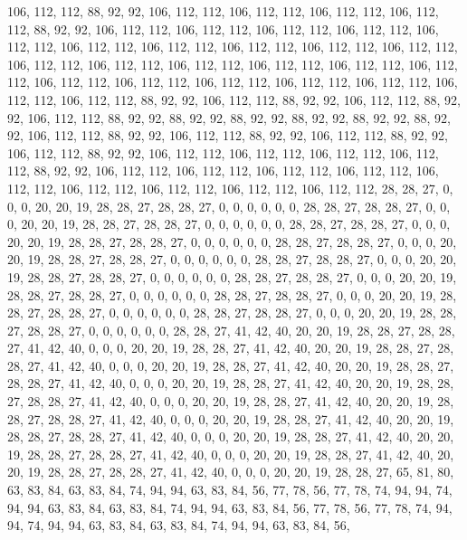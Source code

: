 106, 112, 112, 88, 92, 92, 106, 112, 112, 106, 112, 112, 106, 112, 112, 106, 112, 112, 88, 92, 92, 106, 112, 112, 106, 112, 112, 106, 112, 112, 106, 112, 112, 106, 112, 112, 106, 112, 112, 106, 112, 112, 106, 112, 112, 106, 112, 112, 106, 112, 112, 106, 112, 112, 106, 112, 112, 106, 112, 112, 106, 112, 112, 106,
112, 112, 106, 112, 112, 106, 112, 112, 106, 112, 112, 106, 112, 112, 106, 112, 112, 106, 112, 112, 106, 112, 112, 106, 112, 112, 88, 92, 92, 106, 112, 112, 88, 92, 92, 106, 112, 112, 88, 92, 92, 106, 112, 112, 88, 92, 92, 88, 92, 92, 88, 92, 92, 88, 92, 92, 88, 92, 92, 88, 92, 92, 106, 112,
112, 88, 92, 92, 106, 112, 112, 88, 92, 92, 106, 112, 112, 88, 92, 92, 106, 112, 112, 88, 92, 92, 106, 112, 112, 106, 112, 112, 106, 112, 112, 106, 112, 112, 88, 92, 92, 106, 112, 112, 106, 112, 112, 106, 112, 112, 106, 112, 112, 106, 112, 112, 106, 112, 112, 106, 112, 112, 106, 112, 112, 106, 112, 112,
28, 28, 27, 0, 0, 0, 20, 20, 19, 28, 28, 27, 28, 28, 27, 0, 0, 0, 0, 0, 0, 28, 28, 27, 28, 28, 27, 0, 0, 0, 20, 20, 19, 28, 28, 27, 28, 28, 27, 0, 0, 0, 0, 0, 0, 28, 28, 27, 28, 28, 27, 0, 0, 0, 20, 20, 19, 28, 28, 27, 28, 28, 27, 0,
0, 0, 0, 0, 0, 28, 28, 27, 28, 28, 27, 0, 0, 0, 20, 20, 19, 28, 28, 27, 28, 28, 27, 0, 0, 0, 0, 0, 0, 28, 28, 27, 28, 28, 27, 0, 0, 0, 20, 20, 19, 28, 28, 27, 28, 28, 27, 0, 0, 0, 0, 0, 0, 28, 28, 27, 28, 28, 27, 0, 0, 0, 20, 20,
19, 28, 28, 27, 28, 28, 27, 0, 0, 0, 0, 0, 0, 28, 28, 27, 28, 28, 27, 0, 0, 0, 20, 20, 19, 28, 28, 27, 28, 28, 27, 0, 0, 0, 0, 0, 0, 28, 28, 27, 28, 28, 27, 0, 0, 0, 20, 20, 19, 28, 28, 27, 28, 28, 27, 0, 0, 0, 0, 0, 0, 28, 28, 27,
41, 42, 40, 20, 20, 19, 28, 28, 27, 28, 28, 27, 41, 42, 40, 0, 0, 0, 20, 20, 19, 28, 28, 27, 41, 42, 40, 20, 20, 19, 28, 28, 27, 28, 28, 27, 41, 42, 40, 0, 0, 0, 20, 20, 19, 28, 28, 27, 41, 42, 40, 20, 20, 19, 28, 28, 27, 28, 28, 27, 41, 42, 40, 0,
0, 0, 20, 20, 19, 28, 28, 27, 41, 42, 40, 20, 20, 19, 28, 28, 27, 28, 28, 27, 41, 42, 40, 0, 0, 0, 20, 20, 19, 28, 28, 27, 41, 42, 40, 20, 20, 19, 28, 28, 27, 28, 28, 27, 41, 42, 40, 0, 0, 0, 20, 20, 19, 28, 28, 27, 41, 42, 40, 20, 20, 19, 28, 28,
27, 28, 28, 27, 41, 42, 40, 0, 0, 0, 20, 20, 19, 28, 28, 27, 41, 42, 40, 20, 20, 19, 28, 28, 27, 28, 28, 27, 41, 42, 40, 0, 0, 0, 20, 20, 19, 28, 28, 27, 41, 42, 40, 20, 20, 19, 28, 28, 27, 28, 28, 27, 41, 42, 40, 0, 0, 0, 20, 20, 19, 28, 28, 27,
65, 81, 80, 63, 83, 84, 63, 83, 84, 74, 94, 94, 63, 83, 84, 56, 77, 78, 56, 77, 78, 74, 94, 94, 74, 94, 94, 63, 83, 84, 63, 83, 84, 74, 94, 94, 63, 83, 84, 56, 77, 78, 56, 77, 78, 74, 94, 94, 74, 94, 94, 63, 83, 84, 63, 83, 84, 74, 94, 94, 63, 83, 84, 56,
